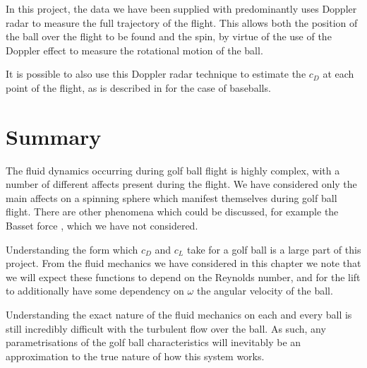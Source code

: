In this project, the data we have been supplied with predominantly uses Doppler radar to measure the
full trajectory of the flight. This allows both the position of the ball over the flight to be found
and the spin, by virtue of the use of the Doppler effect to measure the rotational motion of the ball.

It is possible to also use this Doppler radar technique to estimate the $c_D$ at each point of the 
flight, as is described in \citet{Martin2012} for the case of baseballs.

\section{Summary}

The fluid dynamics occurring during golf ball flight is highly complex, with a number of different affects 
present during the flight. We have considered only the main affects on a spinning sphere which
manifest themselves during golf ball flight. There are other phenomena which could be discussed, 
for example the Basset force \citet{thomas1992influence}, which we have not considered.

Understanding the form which $c_D$ and $c_L$ take for a golf ball is a large part of this project.
From the fluid mechanics we have considered in this chapter we note that we will expect these functions
to depend on the Reynolds number, and for the lift to additionally have some dependency on $\omega$ the
angular velocity of the ball.

Understanding the exact nature of the fluid mechanics on each and every ball is still incredibly
difficult with the turbulent flow over the ball. As such, any parametrisations of the golf ball
characteristics will inevitably be an approximation to the true nature of how this system works.